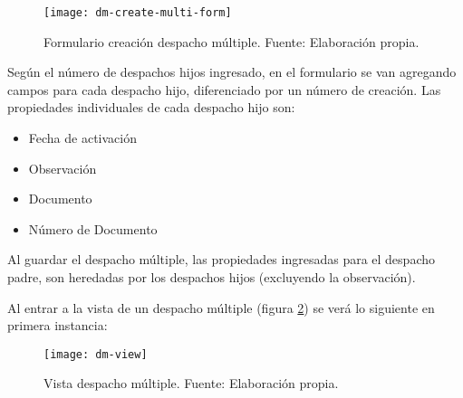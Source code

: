 \begin{figure}[H]
	\centering
	\texttt{[image: dm-create-multi-form]}
	\caption{\label{fig:dm-create-multi-form} Formulario creación despacho múltiple. Fuente: Elaboración propia.}
\end{figure}

Según el número de despachos hijos ingresado, en el formulario se van agregando campos para cada despacho hijo, diferenciado por un número de creación. Las propiedades individuales de cada despacho hijo son:
\begin{itemize}
    \item Fecha de activación
    \item Observación
    \item Documento
    \item Número de Documento
\end{itemize}

Al guardar el despacho múltiple, las propiedades ingresadas para el despacho padre, son heredadas por los despachos hijos (excluyendo la observación).

Al entrar a la vista de un despacho múltiple (figura \ref{fig:dm-view}) se verá lo siguiente en primera instancia:

\begin{figure}[H]
	\centering
	\texttt{[image: dm-view]}
	\caption{\label{fig:dm-view} Vista despacho múltiple. Fuente: Elaboración propia.}
\end{figure}

